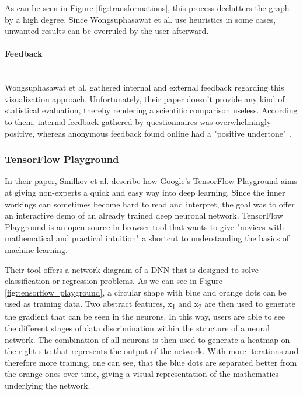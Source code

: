 \documentclass{acmsiggraph}               %
\newcommand{\paragraphbr}[1]{\paragraph{#1}\mbox{}\\}
\begin{document}
As can be seen in Figure \ref{fig:transformations}, this process declutters the graph by a high degree. Since Wongsuphasawat et al. use heuristics in some cases, unwanted results can be overruled by the user afterward.

\paragraphbr{Feedback}

Wongsuphasawat et al. gathered internal and external feedback regarding this visualization approach. Unfortunately, their paper doesn't provide any kind of statistical evaluation, thereby rendering a scientific comparison useless. According to them, internal feedback gathered by questionnaires was overwhelmingly positive, whereas anonymous feedback found online had a "positive undertone" \cite[p.~9]{Wongsuphasawat2018}.

\subsubsection{TensorFlow Playground}

In their paper, Smilkov et al. describe how Google's TensorFlow Playground aims at giving non-experts a quick and easy way into deep learning. Since the inner workings can sometimes become hard to read and interpret, the goal was to offer an interactive demo of an already trained deep neuronal network. TensorFlow Playground is an open-source in-browser tool that wants to give "novices with mathematical and practical intuition" \cite[p.~1]{Smilkov2017} a shortcut to understanding the basics of machine learning.

Their tool offers a network diagram of a DNN that is designed to solve classification or regression problems. As we can see in Figure \ref{fig:tensorflow_playground}, a circular shape with blue and orange dots can be used as training data. Two abstract features, x\textsubscript{1} and x\textsubscript{2} are then used to generate the gradient that can be seen in the neurons. In this way, users are able to see the different stages of data discrimination within the structure of a neural network. The combination of all neurons is then used to generate a heatmap on the right site that represents the output of the network. With more iterations and therefore more training, one can see, that the blue dots are separated better from the orange ones over time, giving a visual representation of the mathematics underlying the network.
\end{document}
